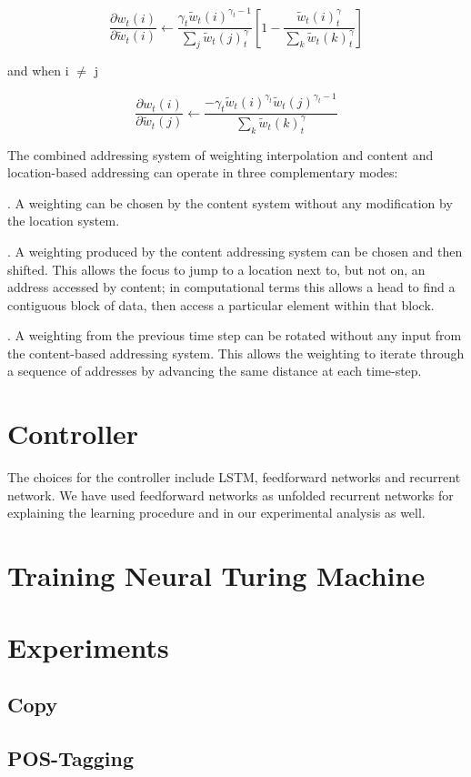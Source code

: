 \begin{equation}
\frac{\partial w_t(i)}{\partial \widetilde{w}_t(i)} \leftarrow \frac{\gamma_t\widetilde{w}_t(i)^{\gamma_t-1}}{\sum_{j}\widetilde{w}_t(j)^\gamma_t}\left [ 1 - \frac{\widetilde{w}_t(i)^\gamma_t}{\sum_{k}\widetilde{w}_t(k)^\gamma_t} \right ]
\end{equation}

\noindent
and when i $\neq$ j

\begin{equation}
\frac{\partial w_t(i)}{\partial \widetilde{w}_t(j)} \leftarrow \frac{-\gamma_t\widetilde{w}_t(i)^{\gamma_t}\widetilde{w}_t(j)^{\gamma_t-1}}{\sum_{k}\widetilde{w}_t(k)^\gamma_t}
\end{equation}

\noindent
The combined addressing system of weighting interpolation and content and location-based addressing can operate in three complementary modes:

. A weighting can be chosen by the content system without any modification by the location system.

. A weighting produced by the content addressing system can be chosen and then shifted. This allows the focus to jump to a location next to, but not on, an address accessed by content; in computational terms this allows a head to find a contiguous block of data, then access a particular element within that block.

. A weighting from the previous time step can be rotated without any input from the content-based addressing system. This allows the weighting to iterate through a sequence of addresses by advancing the same distance at each time-step.

\section{Controller}
The choices for the controller include LSTM\cite{lstm}, feedforward networks and recurrent network. We have used feedforward networks as unfolded recurrent networks for explaining the learning procedure and in our experimental analysis as well.

\section{Training Neural Turing Machine}
\section{Experiments}
\subsection{Copy}
\subsection{POS-Tagging}